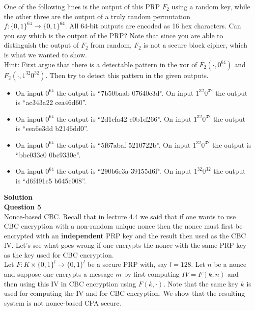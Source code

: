 \documentclass[a4paper,12pt]{article}
\begin{document}
One of the following lines is the output of this PRP $F_{2}$ using a random key, while the other three are the output of a truly random permutation $f:\{0,1\}^{64}\rightarrow \{0,1\}^{64}$. All 64-bit outputs are encoded as 16 hex characters. Can you say which is the output of the PRP? Note that since you are able to distinguish the output of $F_{2}$ from random, $F_{2}$ is not a secure block cipher, which is what we wanted to show.\\ 

Hint: First argue that there is a detectable pattern in the xor of $F_{2}(\cdot,0^{64})$ and $F_{2}(\cdot,1^{32}0^{32})$. Then try to detect this pattern in the given outputs.
%
\begin{itemize}
\item On input $0^{64}$ the output is ``7b50baab 07640c3d''. On input $1^{32}0^{32}$ the output is ``ac343a22 cea46d60''.
\item On input $0^{64}$ the output is ``2d1cfa42 c0b1d266''. On input $1^{32}0^{32}$ the output is ``eea6e3dd b2146dd0''.
\item On input $0^{64}$ the output is ``5f67abaf 5210722b''. On input $1^{32}0^{32}$ the output is ``bbe033c0 0bc9330e''.
\item On input $0^{64}$ the output is ``290b6e3a 39155d6f''. On input $1^{32}0^{32}$ the output is ``d6f491c5 b645c008''.
\end{itemize}

\textbf{Solution}\\

\textbf{Question 5}\\

Nonce-based CBC. Recall that in lecture 4.4 we said that if one wants to use CBC encryption with a non-random unique nonce then the nonce must first be encrypted with an \textbf{independent} PRP key and the result then used as the CBC IV. Let's see what goes wrong if one encrypts the nonce with the same PRP key as the key used for CBC encryption.\\

Let $F:K \times \{0,1\}^{l} \rightarrow \{0,1\}^{l}$ be a secure PRP with, say $l = 128$. Let $n$ be a nonce and suppose one encrypts a message $m$ by first computing $IV=F(k,n)$ and then using this IV in CBC encryption using $F(k,\cdot)$. Note that the same key $k$ is used for computing the IV and for CBC encryption. We show that the resulting system is not nonce-based CPA secure.\\
\end{document}
